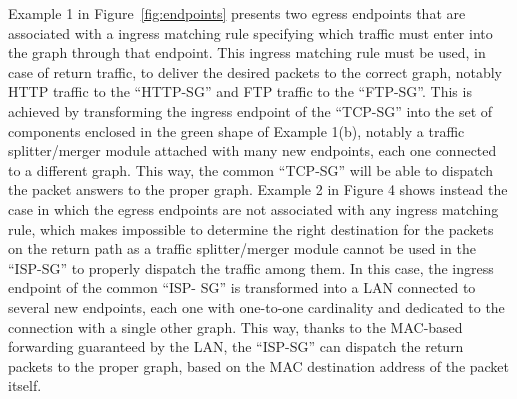 Example 1 in Figure~\ref{fig:endpoints} presents two egress endpoints that are associated with a ingress matching rule specifying which traffic must enter into the graph through that endpoint. This ingress matching rule must be used, in case of return traffic, to deliver the desired packets to the correct graph, notably HTTP traffic to the “HTTP-SG” and FTP traffic to the “FTP-SG”. This is achieved by transforming the ingress endpoint of the “TCP-SG” into the set of components enclosed in the green shape of Example 1(b), notably a traffic splitter/merger module attached with many new endpoints, each one connected to a different graph. This way, the common “TCP-SG” will be able to dispatch the packet answers to the proper graph.
Example 2 in Figure 4 shows instead the case in which the egress endpoints are not associated with any ingress matching rule, which makes impossible to determine the right destination for the packets on the return path as a traffic splitter/merger module cannot be used in the “ISP-SG” to properly dispatch the traffic among them. In this case, the ingress endpoint of the common “ISP- SG” is transformed into a LAN connected to several new endpoints, each one with one-to-one cardinality and dedicated to the connection with a single other graph. This way, thanks to the MAC-based forwarding guaranteed by the LAN, the “ISP-SG” can dispatch the return packets to the proper graph, based on the MAC destination address of the packet itself.
%
%
%
%
